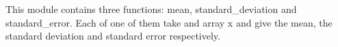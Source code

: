 This module contains three functions: mean, standard_deviation and standard_error. Each of one of them take and array x and give the mean, the standard deviation and standard error respectively.